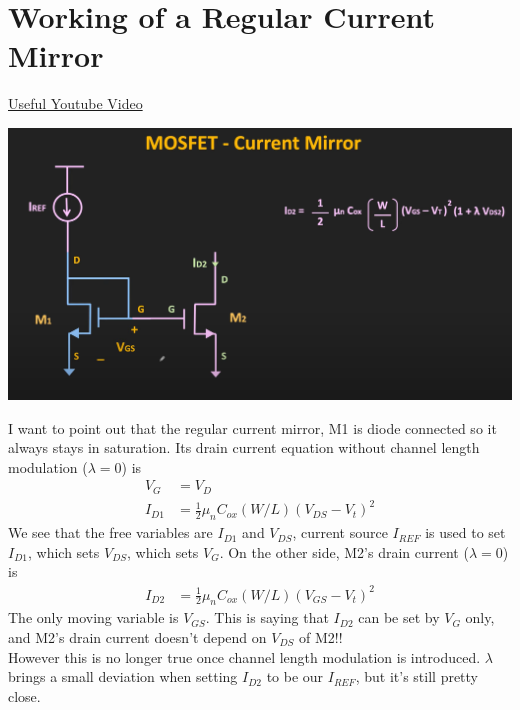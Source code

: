 \documentclass{article}
\begin{document}
	\section{Working of a Regular Current Mirror}
		\href{https://www.youtube.com/watch?v=x9xt9ChSiow&ab_channel=ALLABOUTELECTRONICS}{Useful Youtube Video}
		\begin{center}
			\includegraphics[width=\textwidth]{imgs/screenshot1.png}
		\end{center}
		I want to point out that the regular current mirror, M1 is diode connected so it always stays in saturation. Its drain current equation without channel length modulation ($\lambda=0$) is
		\begin{align*}
			V_G&=V_D\\
			I_{D1}&=\frac{1}{2}\mu_n C_{ox}\left(W/L\right)(V_{DS}-V_t)^2
		\end{align*}
		We see that the free variables are $I_{D1}$ and $V_{DS}$, current source $I_{REF}$ is used to set $I_{D1}$, which sets $V_{DS}$, which sets $V_G$. On the other side, M2's drain current ($\lambda=0$) is 
		\begin{align*}
			I_{D2}&=\frac{1}{2}\mu_n C_{ox}\left(W/L\right)(V_{GS}-V_t)^2
		\end{align*}
		The only moving variable is $V_{GS}$. This is saying that $I_{D2}$ can be set by $V_G$ only, and M2's drain current doesn't depend on $V_{DS}$ of M2!!\\
		However this is no longer true once channel length modulation is introduced. $\lambda$ brings a small deviation when setting $I_{D2}$ to be our $I_{REF}$, but it's still pretty close.
\end{document}
